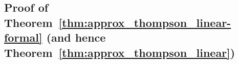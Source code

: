 
























\subsection{Proof of Theorem~\ref{thm:approx_thompson_linear-formal} (and hence Theorem~\ref{thm:approx_thompson_linear}) }\label{sec:pf_thm:approx_thompson_linear-formal}


